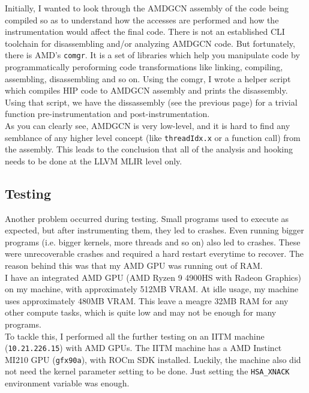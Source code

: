\documentclass{btp}
\begin{document}
\restoregeometry

Initially, I wanted to look through the AMDGCN assembly of the code being compiled so as to understand how the accesses are performed and how the instrumentation would affect the final code. There is not an established CLI toolchain for disassembling and/or analyzing AMDGCN code. But fortunately, there is AMD's \texttt{comgr}. It is a set of libraries which help you manipulate code by programmatically peroforming code transformations like linking, compiling, assembling, disassembling and so on. Using the comgr, I wrote a helper script which compiles HIP code to AMDGCN assembly and prints the disassembly. Using that script, we have the dissassembly (see the previous page) for a trivial function pre-instrumentation and post-instrumentation.
\\
\newline
As you can clearly see, AMDGCN is very low-level, and it is hard to find any semblance of any higher level concept (like \texttt{threadIdx.x} or a function call) from the assembly. This leads to the conclusion that all of the analysis and hooking needs to be done at the LLVM MLIR level only.

\subsection{Testing}

Another problem occurred during testing. Small programs used to execute as expected, but after instrumenting them, they led to crashes. Even running bigger programs (i.e. bigger kernels, more threads and so on) also led to crashes. These were unrecoverable crashes and required a hard restart everytime to recover. The reason behind this was that my AMD GPU was running out of RAM.
\\
\newline
I have an integrated AMD GPU (AMD Ryzen 9 4900HS with Radeon Graphics) on my machine, with approximately 512MB VRAM. At idle usage, my machine uses approximately 480MB VRAM. This leave a meagre 32MB RAM for any other compute tasks, which is quite low and may not be enough for many programs.
\\
\newline
To tackle this, I performed all the further testing on an IITM machine (\texttt{10.21.226.15}) with AMD GPUs. The IITM machine has a AMD Instinct MI210 GPU (\texttt{gfx90a}), with ROCm SDK installed. Luckily, the machine also did not need the kernel parameter setting to be done. Just setting the \texttt{HSA\_XNACK} environment variable was enough.
\end{document}
